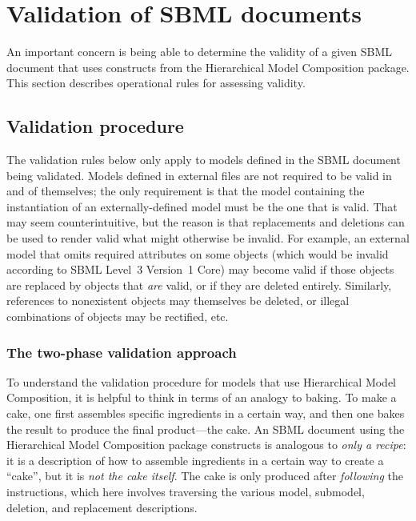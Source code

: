 
\section{Validation of SBML documents}
\label{apdx-validation}

An important concern is being able to determine the validity of a given
SBML document that uses constructs from the Hierarchical Model
Composition package.  This section describes operational rules for
assessing validity.


\subsection{Validation procedure}
\label{validation-procedure}

The validation rules below only apply to models defined in the SBML
document being validated.  Models defined in external files are not
required to be valid in and of themselves; the only requirement is that
the model containing the instantiation of an externally-defined model
must be the one that is valid.  That may seem counterintuitive, but the
reason is that replacements and deletions can be used to render valid
what might otherwise be invalid.  For example, an external model that
omits required attributes on some objects (which would be invalid
according to SBML Level~3 Version~1 Core) may become valid if those
objects are replaced by objects that \emph{are} valid, or if they are
deleted entirely.  Similarly, references to nonexistent objects may
themselves be deleted, or illegal combinations of objects may be
rectified, etc.


\subsubsection{The two-phase validation approach}

To understand the validation procedure for models that use Hierarchical
Model Composition, it is helpful to think in terms of an analogy to
baking.  To make a cake, one first assembles specific ingredients in a
certain way, and then one bakes the result to produce the final
product---the cake.  An SBML document using the Hierarchical Model
Composition package constructs is analogous to \emph{only a recipe}: it
is a description of how to assemble ingredients in a certain way to
create a ``cake'', but it is \emph{not the cake itself}.  The cake is
only produced after \emph{following} the instructions, which here
involves traversing the various model, submodel, deletion, and
replacement descriptions.


